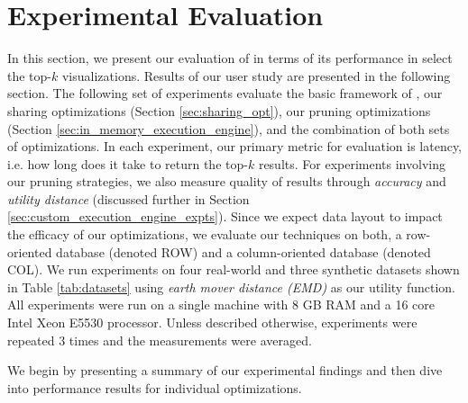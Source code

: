 
\section{Experimental Evaluation}
\label{sec:experiments}
 
In this section, we present our evaluation of \SeeDB in terms of its performance 
in select the top-$k$ visualizations. 
Results of our user study are presented in the following section.
The following set of experiments evaluate the basic framework of \SeeDB, our sharing optimizations 
(Section \ref{sec:sharing_opt}), our pruning optimizations (Section \ref{sec:in_memory_execution_engine}), 
and the combination of both sets of optimizations.
In each experiment, our primary metric for evaluation is latency, 
i.e. how long does it take \SeeDB to return the top-$k$ results. 
For experiments involving our pruning strategies, we also measure quality of results 
through {\it accuracy} and {\it utility distance} (discussed further in Section \ref{sec:custom_execution_engine_expts}).
Since we expect data layout to impact the efficacy of our optimizations, we 
evaluate our techniques on both, a row-oriented database (denoted ROW) and a
column-oriented database (denoted COL).
We run experiments on four real-world and three synthetic datasets shown in Table 
\ref{tab:datasets} using {\it earth mover distance (EMD)} as our utility function.
All experiments were run on a single machine with 8 GB RAM and a 16 core Intel 
Xeon E5530 processor. 
Unless described otherwise, experiments were repeated 3 times and the measurements 
were averaged.

We begin by presenting a summary of our experimental findings and then dive into performance results for 
individual optimizations.




